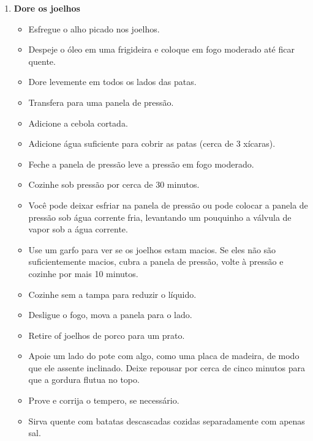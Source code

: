 \documentclass [11pt, letterpaper] {article}
\newcommand \fileName {PorkKnuckle}
\begin{document}
\begin {description}
\begin {enumerate}
\item {\bf Dore os joelhos}
\begin {itemize}
\item Esfregue o alho picado nos joelhos.
\item Despeje o óleo em uma frigideira e coloque em fogo moderado até ficar quente.
\item Dore levemente em todos os lados das patas.
\item Transfera para uma panela de pressão.
\item Adicione a cebola cortada.
\item Adicione água suficiente para cobrir as patas (cerca de 3 xícaras).
\item Feche a panela de pressão leve a pressão em fogo moderado.
\item Cozinhe sob pressão por cerca de 30 minutos.
\item Você pode deixar esfriar na panela de pressão ou pode colocar a panela de pressão sob água corrente fria, levantando um pouquinho a válvula de vapor sob a água corrente.
\item Use um garfo para ver se os joelhos estam macios. Se eles não são suficientemente macios, cubra a panela de pressão, volte \`a press\~ao e cozinhe por mais 10 minutos.
\item Cozinhe sem a tampa para reduzir o líquido.
\item Desligue o fogo, mova a panela para o lado.
\item Retire of joelhos de porco para um prato.
\item Apoie um lado do pote com algo, como uma placa de madeira, de modo que ele assente inclinado. Deixe repousar por cerca de cinco minutos para que a gordura flutua no topo.
\item Prove e corrija o tempero, se necessário.
\item Sirva quente com batatas descascadas cozidas separadamente com apenas sal.
\end {itemize}
\end {enumerate}
\end {description}

\end{document}
